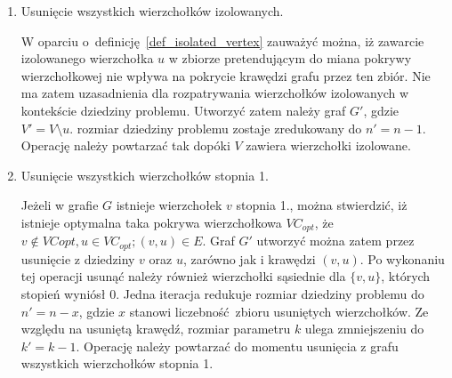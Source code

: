 \begin{enumerate}
  \item Usunięcie wszystkich wierzchołków izolowanych.


    W oparciu o~definicję~\ref{def_isolated_vertex} zauważyć można, iż zawarcie
    izolowanego wierzchołka $u$ w zbiorze pretendującym do miana pokrywy
    wierzchołkowej nie wpływa na pokrycie krawędzi grafu przez ten zbiór.
    Nie ma zatem uzasadnienia dla rozpatrywania wierzchołków izolowanych w
    kontekście dziedziny problemu.
    Utworzyć zatem należy graf $G\prime$, gdzie $V\prime = V
    \setminus u$.
    rozmiar dziedziny problemu zostaje zredukowany do $n\prime=n-1$.
    Operację należy powtarzać tak dopóki $V$ zawiera wierzchołki izolowane.

  \item Usunięcie wszystkich wierzchołków stopnia 1.


    Jeżeli w grafie $G$ istnieje wierzchołek $v$ stopnia 1., można 
    stwierdzić, iż istnieje optymalna taka pokrywa wierzchołkowa $VC_{opt}$, że
    $v \notin VC{opt}, u \in VC_{opt}; (v,u) \in E$.
    Graf $G\prime$ utworzyć można zatem przez usunięcie z dziedziny $v$ oraz
    $u$, zarówno jak i krawędzi $(v,u)$.
    Po wykonaniu tej operacji usunąć należy również wierzchołki sąsiednie dla
    $\{v,u\}$, których stopień wyniósł 0.
    Jedna iteracja redukuje rozmiar dziedziny problemu do $n\prime=n-x$, gdzie
    $x$ stanowi liczebność~zbioru usuniętych wierzchołków.
    Ze względu na usuniętą krawędź, rozmiar parametru $k$ ulega zmniejszeniu do
    $k\prime=k-1$.
    Operację należy powtarzać do momentu usunięcia z grafu wszystkich
    wierzchołków stopnia 1.


\end{enumerate}
